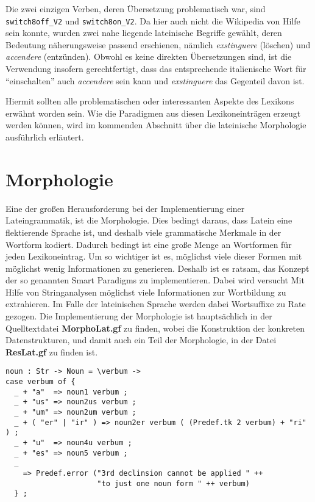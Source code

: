 \documentclass[fontsize=12pt,abstract=on,titlepage,bibliography=totoc,ngerman,listof=totoc]{scrreprt}
\begin{document}
Die zwei einzigen Verben, deren Übersetzung problematisch war, sind \texttt{switch8off\_V2} und \texttt{switch8on\_V2}. Da hier auch nicht die Wikipedia von Hilfe sein konnte, wurden zwei nahe liegende lateinische Begriffe gewählt, deren Bedeutung näherungsweise passend erschienen, nämlich \textit{exstinguere} (löschen) und \textit{accendere} (entzünden). Obwohl es keine direkten Übersetzungen sind, ist die Verwendung insofern gerechtfertigt, dass das entsprechende italienische Wort für ``einschalten'' auch \textit{accendere} sein kann und \textit{exstinguere} das Gegenteil davon ist. \par
Hiermit sollten alle problematischen oder interessanten Aspekte des Lexikons erwähnt worden sein. Wie die Paradigmen aus diesen Lexikoneinträgen erzeugt werden können, wird im kommenden Abschnitt über die lateinische Morphologie ausführlich erläutert.
\FloatBarrier
\pagebreak
\section{Morphologie}
\label{sec:morpho}
Eine der großen Herausforderung bei der Implementierung einer Lateingrammatik, ist die Morphologie. Dies bedingt daraus, dass Latein eine flektierende Sprache ist, und deshalb viele grammatische Merkmale in der Wortform kodiert. Dadurch bedingt ist eine große Menge an Wortformen für jeden Lexikoneintrag. Um so wichtiger ist es, möglichst viele dieser Formen mit möglichst wenig Informationen zu generieren. Deshalb ist es ratsam, das Konzept der so genannten Smart Paradigms zu implementieren. Dabei wird versucht Mit Hilfe von Stringanalysen möglichst viele Informationen zur Wortbildung zu extrahieren. Im Falle der lateinischen Sprache werden dabei Wortsuffixe zu Rate gezogen. Die Implementierung der Morphologie ist hauptsächlich in der Quelltextdatei \textbf{MorphoLat.gf} zu finden, wobei die Konstruktion der konkreten Datenstrukturen, und damit auch ein Teil der Morphologie, in der Datei \textbf{ResLat.gf} zu finden ist.
\begin{lstlisting}[float=ht,caption={Beispiel für ein Smart Paradigm mit Hilfe von Pattern matching},label={GF-Morpho-Noun}]
noun : Str -> Noun = \verbum -> 
case verbum of {
  _ + "a"  => noun1 verbum ;
  _ + "us" => noun2us verbum ;
  _ + "um" => noun2um verbum ;
  _ + ( "er" | "ir" ) => noun2er verbum ( (Predef.tk 2 verbum) + "ri" ) ;
  _ + "u"  => noun4u verbum ;
  _ + "es" => noun5 verbum ;
  _  
    => Predef.error ("3rd declinsion cannot be applied " ++ 
                     "to just one noun form " ++ verbum)
  } ;
\end{lstlisting}
\end{document}
